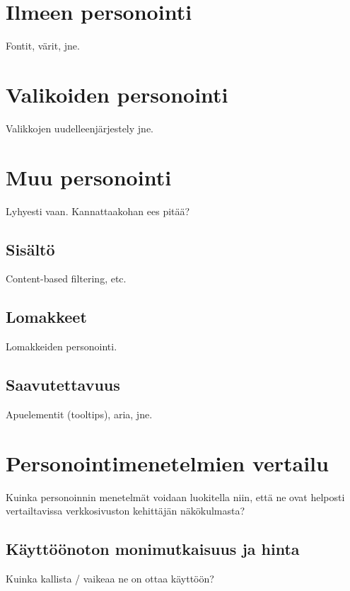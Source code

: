 \documentclass[finnish, 12pt, a4paper, elec, utf8, a-1b, online]{aaltothesis}
\begin{document}
\section{Ilmeen personointi}

Fontit, värit, jne.

\section{Valikoiden personointi}\label{menus}

Valikkojen uudelleenjärjestely jne.

\section{Muu personointi}

Lyhyesti vaan. Kannattaakohan ees pitää?

\subsection{Sisältö}

Content-based filtering, etc.

\subsection{Lomakkeet}

Lomakkeiden personointi.

\subsection{Saavutettavuus}

Apuelementit (tooltips), aria, jne.

\clearpage

\section{Personointimenetelmien vertailu}

Kuinka personoinnin menetelmät voidaan luokitella niin, että ne ovat helposti
vertailtavissa verkkosivuston kehittäjän näkökulmasta?

\subsection{Käyttöönoton monimutkaisuus ja hinta}

Kuinka kallista / vaikeaa ne on ottaa käyttöön?
\end{document}

